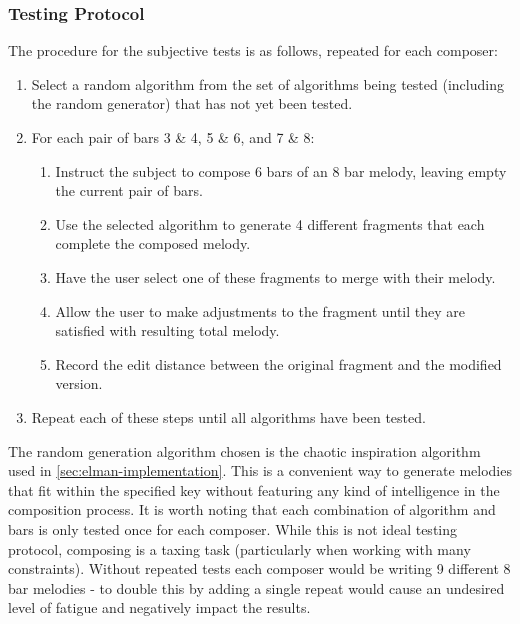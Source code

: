 \documentclass[ author={Stephen Livermore-Tozer},
				supervisor={Dr. Peter Flach},
				degree={MEng},
				title={Algorithmic Co-composition Using Machine Learning},
				subtitle={},
				type={research},
				year={2016} ]{dissertation}
\begin{document}
	\subsubsection{Testing Protocol}
	
	The procedure for the subjective tests is as follows, repeated for each composer:
	\begin{enumerate}
		\item Select a random algorithm from the set of algorithms being tested (including the random generator) that has not yet been tested.
		\item For each pair of bars 3 \& 4, 5 \& 6, and 7 \& 8:
		\begin{enumerate}
			\item Instruct the subject to compose 6 bars of an 8 bar melody, leaving empty the current pair of bars.
			\item Use the selected algorithm to generate 4 different fragments that each complete the composed melody.
			\item Have the user select one of these fragments to merge with their melody.
			\item Allow the user to make adjustments to the fragment until they are satisfied with resulting total melody.
			\item Record the edit distance between the original fragment and the modified version.
		\end{enumerate}
		\item Repeat each of these steps until all algorithms have been tested.
	\end{enumerate}
	
	The random generation algorithm chosen is the chaotic inspiration algorithm used in \ref{sec:elman-implementation}. This is a convenient way to generate melodies that fit within the specified key without featuring any kind of intelligence in the composition process. It is worth noting that each combination of algorithm and bars is only tested once for each composer. While this is not ideal testing protocol, composing is a taxing task (particularly when working with many constraints). Without repeated tests each composer would be writing 9 different 8 bar melodies - to double this by adding a single repeat would cause an undesired level of fatigue and negatively impact the results. 
	
\end{document}
